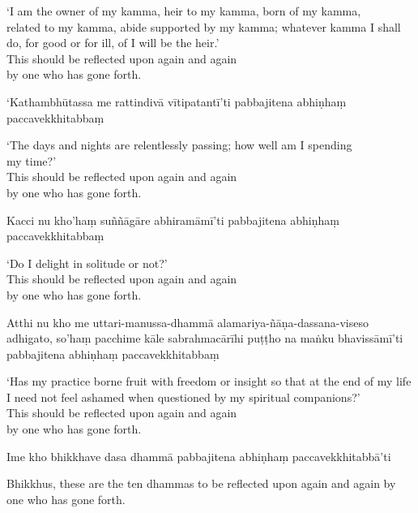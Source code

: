 \begin{english}
  `I am the owner of my kamma, heir to my kamma, born of my kamma,\\
  related to my kamma, abide supported by my kamma; whatever kamma I shall do, for good or for ill, of  I will be the heir.'\\
  This should be reflected upon again and again\\
  by one who has gone forth.
\end{english}

`Kathambhūtassa me rattindivā vītipatantī'ti pabbajitena abhiṇhaṃ paccavekkhitabbaṃ

\begin{english}
  `The days and nights are relentlessly passing; how well am I spending\\ my time?'\\
  This should be reflected upon again and again\\
  by one who has gone forth.
\end{english}

Kacci nu kho'haṃ suññāgāre abhiramāmī'ti pabbajitena abhiṇhaṃ paccavekkhitabbaṃ

\begin{english}
  `Do I delight in solitude or not?'\\
  This should be reflected upon again and again\\
  by one who has gone forth.
\end{english}

Atthi nu kho me uttari-manussa-dhammā alamariya-ñāṇa-dassana-viseso adhigato, so'haṃ pacchime kāle sabrahmacārīhi puṭṭho na maṅku bhavissāmī'ti pabbajitena abhiṇhaṃ paccavekkhitabbaṃ

\begin{english}
  `Has my practice borne fruit with freedom or insight so that at the end of my life I need not feel ashamed when questioned by my spiritual companions?'\\
  This should be reflected upon again and again\\
  by one who has gone forth.
\end{english}

Ime kho bhikkhave dasa dhammā pabbajitena abhiṇhaṃ paccavekkhitabbā'ti

\begin{english}
  Bhikkhus, these are the ten dhammas to be reflected upon again and again by one who has gone forth.
\end{english}

